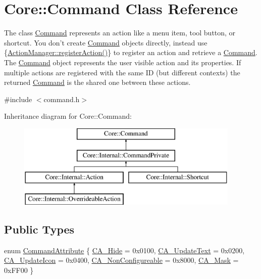 \hypertarget{class_core_1_1_command}{\section{\-Core\-:\-:\-Command \-Class \-Reference}
\label{class_core_1_1_command}
}


\-The class \hyperlink{class_core_1_1_command}{\-Command} represents an action like a menu item, tool button, or shortcut. \-You don't create \hyperlink{class_core_1_1_command}{\-Command} objects directly, instead use \{\hyperlink{group___core_plugin_ga316dd0cff29b294cd1b0631677f6357d}{\-Action\-Manager\-::register\-Action()}\} to register an action and retrieve a \hyperlink{class_core_1_1_command}{\-Command}. \-The \hyperlink{class_core_1_1_command}{\-Command} object represents the user visible action and its properties. \-If multiple actions are registered with the same \-I\-D (but different contexts) the returned \hyperlink{class_core_1_1_command}{\-Command} is the shared one between these actions.  




{\ttfamily \#include $<$command.\-h$>$}

\-Inheritance diagram for \-Core\-:\-:\-Command\-:\begin{figure}[H]
\begin{center}
\leavevmode
\includegraphics[height=4.000000cm]{class_core_1_1_command}
\end{center}
\end{figure}
\subsection*{\-Public \-Types}
\begin{DoxyCompactItemize}
\item 
enum \hyperlink{group___core_plugin_ga4d899c1f711159a432afeab3eb78c917}{\-Command\-Attribute} \{ \*
\hyperlink{group___core_plugin_gga4d899c1f711159a432afeab3eb78c917ab40bdce625687830fbabbab74f3566f0}{\-C\-A\-\_\-\-Hide} =  0x0100, 
\hyperlink{group___core_plugin_gga4d899c1f711159a432afeab3eb78c917a458aeb773c85933e0dd3e1bbf5a4243c}{\-C\-A\-\_\-\-Update\-Text} =  0x0200, 
\hyperlink{group___core_plugin_gga4d899c1f711159a432afeab3eb78c917a838b5063e78a4f22a5aa7fa17c7f9358}{\-C\-A\-\_\-\-Update\-Icon} =  0x0400, 
\hyperlink{group___core_plugin_gga4d899c1f711159a432afeab3eb78c917aba521f39f43b4328b76f678656a12d36}{\-C\-A\-\_\-\-Non\-Configureable} =  0x8000, 
\*
\hyperlink{group___core_plugin_gga4d899c1f711159a432afeab3eb78c917af24dbbade51b0afabda629e630197657}{\-C\-A\-\_\-\-Mask} =  0x\-F\-F00
 \}
\end{DoxyCompactItemize}
